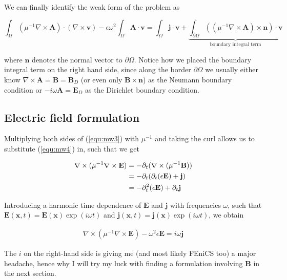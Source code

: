 \documentclass[11pt, a4paper]{article}
\begin{document}
We can finally identify the weak form of the problem as

\begin{equation}
    \int_{\Omega} ({\mu^{-1} \nabla \times \mathbf{A}}) \cdot (\nabla \times \mathbf{v})
    - \epsilon \omega^2 \int_{\Omega} \mathbf{A} \cdot \mathbf{v} 
    = \int_{\Omega} \mathbf{j} \cdot \mathbf{v}
    + \underbrace{\int_{\partial \Omega} (({\mu^{-1} \nabla \times \mathbf{A}}) \times \mathbf{n}) \cdot \mathbf{v}}_{\text{boundary integral term}} \label{equ:mwweaksimple}
\end{equation}

where $\mathbf{n}$ denotes the normal vector to $\partial \Omega$. Notice how we placed
the boundary integral term on the right hand side, since along the border 
$\partial \Omega$ we usually either know $\nabla \times \mathbf{A} = \mathbf{B} = \mathbf{B}_D$
(or even only $\mathbf{B} \times \mathbf{n}$) as the Neumann boundary condition
or $-i \omega \mathbf{A} = \mathbf{E}_D$ as the Dirichlet boundary condition.

\subsection{Electric field formulation}
\label{subsec:electricfield}

Multiplying both sides of (\ref{equ:mw3}) with $\mu^{-1}$ and taking the curl
allows us to substitute (\ref{equ:mw4}) in, such that we get 

\begin{align}
    \nabla \times (\mu^{-1} \nabla \times \mathbf{E})
    &= - \partial_t (\nabla \times (\mu^{-1} \mathbf{B})) \notag \\
    &= - \partial_t (\partial_t (\epsilon \mathbf{E}) + \mathbf{j}) \notag \\
    &= - \partial_t^2 (\epsilon \mathbf{E}) + \partial_t \mathbf{j}
\end{align}

Introducing a harmonic time dependence
of $\mathbf{E}$ and $\mathbf{j}$ with frequencies $\omega$, such that $\mathbf{E}(\mathbf{x}, t) = 
\mathbf{E}(\mathbf{x})\exp(i \omega t)$ and $\mathbf{j}(\mathbf{x}, t) = 
\mathbf{j}(\mathbf{x})\exp(i \omega t)$, we obtain 

\begin{align}
    \nabla \times (\mu^{-1} \nabla \times \mathbf{E}) - \omega^2 \epsilon \mathbf{E} = i \omega \mathbf{j}
\end{align}

The $i$ on the right-hand side is giving me (and most likely FEniCS too) a major
headache, hence why I will try my luck with finding a formulation involving 
$\mathbf{B}$ in the next section.
\end{document}
